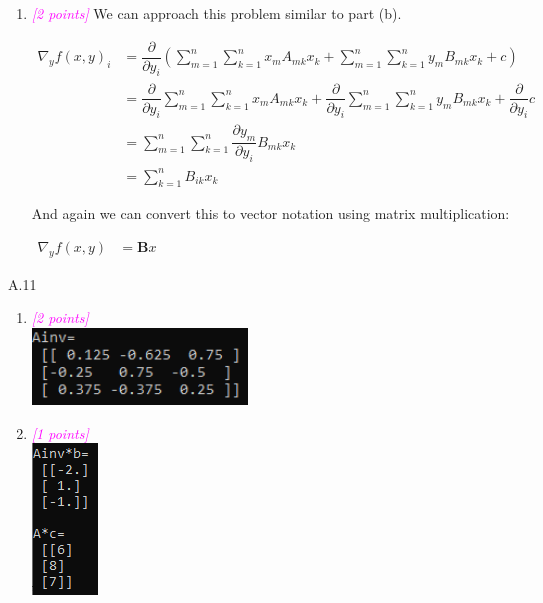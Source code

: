 \documentclass{article}
\newcommand{\1}{\mathbf{1}}
\newcommand{\mat}[1]{\boldsymbol{#1}} %
\newcommand{\points}[1]{\small\textcolor{magenta}{\emph{[#1 points]}} \normalsize}
\begin{document}
\begin{enumerate}
	\item \points{2} 
	We can approach this problem similar to part (b).
	\begin{center}
		$\begin{aligned}\nabla_{y}f(x,y)_i&=\dfrac{\partial}{\partial y_i}\left(\sum_{m=1}^{n}\sum_{k=1}^{n}x_mA_{mk}x_k+\sum_{m=1}^{n}\sum_{k=1}^{n}y_mB_{mk}x_k+c\right)\\
		&= \dfrac{\partial}{\partial y_i}\sum_{m=1}^{n}\sum_{k=1}^{n}x_mA_{mk}x_k +  \dfrac{\partial}{\partial y_i}\sum_{m=1}^{n}\sum_{k=1}^{n}y_mB_{mk}x_k +\dfrac{\partial}{\partial y_i}c\\
		&= \sum_{m=1}^{n}\sum_{k=1}^{n}\dfrac{\partial y_m}{\partial y_i}B_{mk}x_k\\
		&= \sum_{k=1}^{n}B_{ik}x_k\end{aligned}$
	\end{center}
	And again we can convert this to vector notation using matrix multiplication:
		\begin{center}
		$\begin{aligned}\nabla_{y}f(x,y)&= \mat{B}x\end{aligned}$
	\end{center}
\end{enumerate}

A.11 
  \begin{enumerate}
  \item \points{2} \\ \includegraphics[width=2.25in]{A11a.png}
  \item \points{1} \\ \includegraphics[width=.75in]{A11b.png}
  \end{enumerate}  
\end{document}

